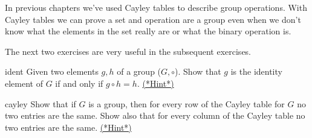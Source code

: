 In previous chapters we've used Cayley tables to describe group operations.  With Cayley tables we can prove a set and operation are a group even when we don't know what the elements in the set really are or what the binary operation is.


The next two exercises are very useful in the  subsequent exercises.

\begin{exercise}{ident}
Given two elements $g,h$  of a group ($G,\circ$). Show that $g$ is the identity element of $G$ if and only if  $g \circ h = h$.
\hyperref[sec:groups:hints]{(*Hint*)} 
\end{exercise}

\begin{exercise}{cayley}
Show that if $G$ is a group, then for every row of the Cayley table for $G$ no two entries are the same. Show also that for every column of the Cayley table no two entries are the same.
\hyperref[sec:groups:hints]{(*Hint*)}  
\end{exercise}


